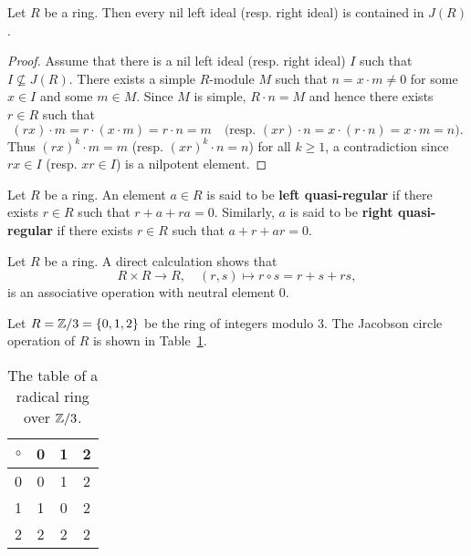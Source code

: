 \begin{proposition}
	\label{pro:nilJ}
	Let $R$ be a ring. Then every nil left ideal (resp. right ideal) is contained in $J(R)$.
\end{proposition}

\begin{proof}
	Assume that there is a nil left ideal (resp. right ideal) $I$ such that 
	$I\not\subseteq J(R)$. There exists a simple $R$-module $M$ such that 
	$n=x\cdot m\ne 0$ for some $x\in I$ and some $m\in M$. Since $M$ is simple,
	$R\cdot n=M$ and hence there exists $r\in R$ such that 
	\[
	(rx)\cdot m=r\cdot (x\cdot m)=r\cdot n=m\quad\text{(resp.
	$(xr)\cdot n=x\cdot (r\cdot n)=x\cdot m=n$).}
	\]
	Thus $(rx)^k\cdot m=m$ (resp. $(xr)^k\cdot n=n$) for all 
	$k\geq1$, a contradiction since $rx\in I$ (resp. $xr\in I$) is a nilpotent element. 
\end{proof}

\begin{definition}
Let $R$ be a ring. An element $a\in R$ is said to be 
\textbf{left quasi-regular} if there exists $r\in R$ such that $r+a+ra=0$. Similarly, 
$a$ is said to be \textbf{right quasi-regular} if there exists $r\in R$ such that $a+r+ar=0$. 
\end{definition}

Let $R$ be a ring. A direct calculation shows that
\[
R\times R\to R,
\quad
(r,s)\mapsto r\circ s=r+s+rs,
\]
is an associative operation with neutral element $0$.

\begin{example}
Let $R=\mathbb{Z}/3=\{0,1,2\}$ be the ring of integers modulo 3. 
The Jacobson circle 
operation of $R$ is shown in Table~\ref{tab:radical}.

	\begin{table}[bht]
  		\caption{The table of a radical ring over $\mathbb{Z}/3$.}
		\centering
		\begin{tabular}{c|ccc}
			$\circ$ & 0 & 1 & 2\tabularnewline
			\hline
			0 & 0 & 1 & 2\tabularnewline
			1 & 1 & 0 & 2\tabularnewline
			2 & 2 & 2 & 2\tabularnewline
		\end{tabular}
    \label{tab:radical}
 	\end{table}
\end{example}


